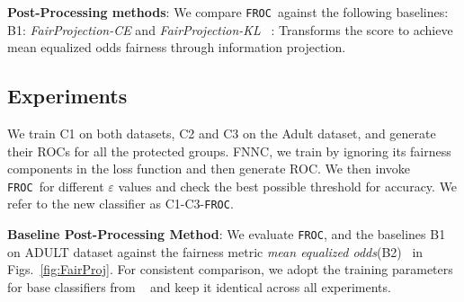 \documentclass{article}
\newcommand{\ouralgo}{\texttt{FROC}}
\begin{document}
\noindent \textbf{Post-Processing methods}: 
We compare \ouralgo\  against the following baselines: 
    B1: \emph{FairProjection-CE} and \emph{FairProjection-KL} ~\cite{alghamdi2022}: Transforms the score to achieve mean equalized odds fairness through information projection.


\subsection{Experiments} 

We train C1 on both datasets, C2 and C3 on the Adult dataset, and generate their ROCs for all the protected groups. FNNC, we train by ignoring its fairness components in the loss function and then generate ROC. We then invoke \ouralgo\ for different $\varepsilon$ values and check the best possible threshold for accuracy. We refer to the new classifier as C1-C3-\ouralgo.%

\noindent \textbf{Baseline Post-Processing Method}: We evaluate \ouralgo, and the baselines B1 on ADULT dataset against the fairness metric \emph{mean equalized odds}(B2)~\cite{alghamdi2022}  in Figs.~\ref{fig:FairProj}.
For consistent comparison, we adopt the training parameters for base classifiers from ~\cite{alghamdi2022} and keep it identical across all experiments.
\end{document}
